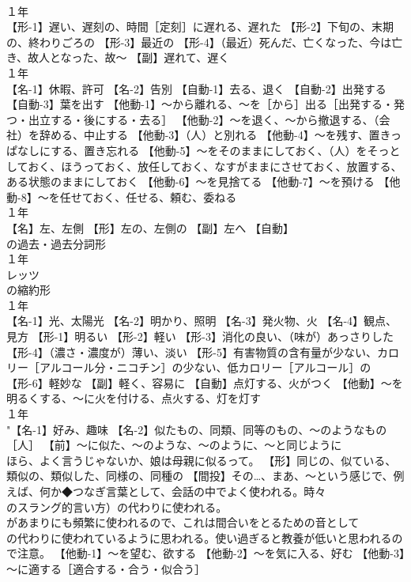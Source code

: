 \documentclass[8pt]{extreport}
\begin{document}
\begin{CJK}{UTF8}{min}
\\	１年	
\\	【形-1】遅い、遅刻の、時間［定刻］に遅れる、遅れた 【形-2】下旬の、末期の、終わりごろの 【形-3】最近の 【形-4】（最近）死んだ、亡くなった、今は亡き、故人となった、故～ 【副】遅れて、遅く
\\	１年	
\\	【名-1】休暇、許可 【名-2】告別 【自動-1】去る、退く 【自動-2】出発する 【自動-3】葉を出す 【他動-1】～から離れる、～を［から］出る［出発する・発つ・出立する・後にする・去る］ 【他動-2】～を退く、～から撤退する、（会社）を辞める、中止する 【他動-3】（人）と別れる 【他動-4】～を残す、置きっぱなしにする、置き忘れる 【他動-5】～をそのままにしておく、（人）をそっとしておく、ほうっておく、放任しておく、なすがままにさせておく、放置する、ある状態のままにしておく 【他動-6】～を見捨てる 【他動-7】～を預ける 【他動-8】～を任せておく、任せる、頼む、委ねる
\\	１年	
\\	【名】左、左側 【形】左の、左側の 【副】左へ 【自動】
\\	の過去・過去分詞形
\\	１年	
\\	レッツ 
\\	の縮約形
\\	１年	
\\	【名-1】光、太陽光 【名-2】明かり、照明 【名-3】発火物、火 【名-4】観点、見方 【形-1】明るい 【形-2】軽い 【形-3】消化の良い、（味が）あっさりした 【形-4】（濃さ・濃度が）薄い、淡い 【形-5】有害物質の含有量が少ない、カロリー［アルコール分・ニコチン］の少ない、低カロリー［アルコール］の 【形-6】軽妙な 【副】軽く、容易に 【自動】点灯する、火がつく 【他動】～を明るくする、～に火を付ける、点火する、灯を灯す
\\	１年	
\\	"【名-1】好み、趣味 【名-2】似たもの、同類、同等のもの、～のようなもの［人］ 【前】～に似た、～のような、～のように、～と同じように 
\\	ほら、よく言うじゃないか、娘は母親に似るって。 【形】同じの、似ている、類似の、類似した、同様の、同種の 【間投】その…、まあ、～という感じで、例えば、何か◆つなぎ言葉として、会話の中でよく使われる。時々 
\\	のスラング的言い方）の代わりに使われる。
\\	があまりにも頻繁に使われるので、これは間合いをとるための音として
\\	の代わりに使われているように思われる。使い過ぎると教養が低いと思われるので注意。 【他動-1】～を望む、欲する 【他動-2】～を気に入る、好む 【他動-3】～に適する［適合する・合う・似合う］

\end{CJK}
\end{document}
